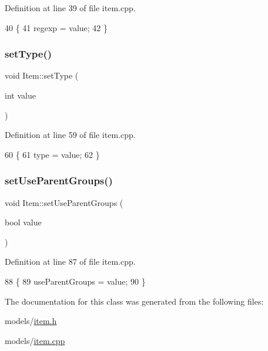 Definition at line 39 of file item.\+cpp.


\begin{DoxyCode}
40 \{
41     regexp = value;
42 \}
\end{DoxyCode}
\mbox{\label{class_item_ad1b9dd3edd2a2e33e44a3f84707e96d5}} 
\subsubsection{\texorpdfstring{set\+Type()}{setType()}}
{\footnotesize\ttfamily void Item\+::set\+Type (\begin{DoxyParamCaption}\item[{int}]{value }\end{DoxyParamCaption})}



Definition at line 59 of file item.\+cpp.


\begin{DoxyCode}
60 \{
61     type = value;
62 \}
\end{DoxyCode}
\mbox{\label{class_item_a28d35e796991b8b314acaffe19cc8f84}} 
\subsubsection{\texorpdfstring{set\+Use\+Parent\+Groups()}{setUseParentGroups()}}
{\footnotesize\ttfamily void Item\+::set\+Use\+Parent\+Groups (\begin{DoxyParamCaption}\item[{bool}]{value }\end{DoxyParamCaption})}



Definition at line 87 of file item.\+cpp.


\begin{DoxyCode}
88 \{
89     useParentGroups = value;
90 \}
\end{DoxyCode}


The documentation for this class was generated from the following files\+:\begin{DoxyCompactItemize}
\item 
models/\hyperlink{item_8h}{item.\+h}\item 
models/\hyperlink{item_8cpp}{item.\+cpp}\end{DoxyCompactItemize}
